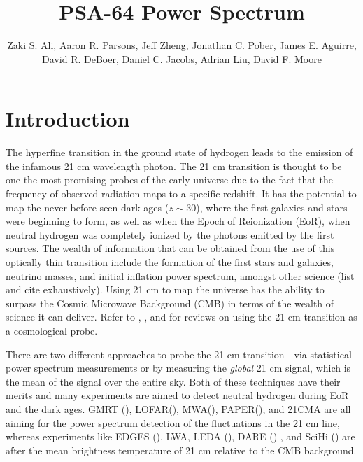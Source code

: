 \documentclass[twocolumn,numberedappendix]{emulateapj} \shorttitle{PSA64}
\begin{document}
 \title{PSA-64 Power Spectrum}

\author{ Zaki S. Ali, Aaron R. Parsons, Jeff
Zheng, Jonathan C. Pober, James E. Aguirre,
David R. DeBoer, Daniel C. Jacobs, Adrian
Liu, David F. Moore
}

 

\begin{abstract} \end{abstract}


\section{Introduction} The hyperfine transition in the ground state of hydrogen
leads to the emission of the infamous 21 cm wavelength photon. The 21 cm
transition is thought to be one the most promising probes of the early universe
due to the fact that the frequency of observed radiation maps to a specific
redshift. It has the potential to map the never before seen dark ages
($z\sim{30}$), where the first galaxies and stars were beginning to form, as
well as when the Epoch of Reionization (EoR), when neutral hydrogen was
completely ionized by the photons emitted by the first sources. The wealth of
information that can be obtained from the use of this optically thin transition
include the formation of the first stars and galaxies, neutrino masses, and
initial inflation power spectrum, amongst other science (list and cite
exhaustively). Using 21 cm to map the universe has the ability to surpass the
Cosmic Microwave Background (CMB) in terms of the wealth of science it can
deliver. Refer to \cite{furlanetto_et_al2006}, \cite{morales_wyithe2010}, and
\cite{pritchard_loeb2012} for reviews on using the 21 cm transition as a
cosmological probe.

There are two different approaches to probe the 21 cm transition - via
statistical power spectrum measurements or by measuring the \emph{global} 21 cm
signal, which is the mean of the signal over the entire sky. Both of these
techniques have their merits and many experiments are aimed to detect neutral
hydrogen during EoR and the dark ages. GMRT (\cite{paciga_et_al2011}),
LOFAR(\cite{rottgering_et_al2006}), MWA(\cite{tingay_et_al2013}),
PAPER(\cite{parsons_et_al2010}), and 21CMA are all aiming for the power spectrum
detection of the fluctuations in the 21 cm line, whereas experiments like EDGES
(\cite{bowman_et_al2010}), LWA, LEDA (\cite{lincoln_bernardi_2012}), DARE
(\cite{burns_et_al2012}) , and SciHi (\cite{tabitha_et_al2014}) are after the
mean brightness temperature of 21 cm relative to the CMB background. 
\end{document}
